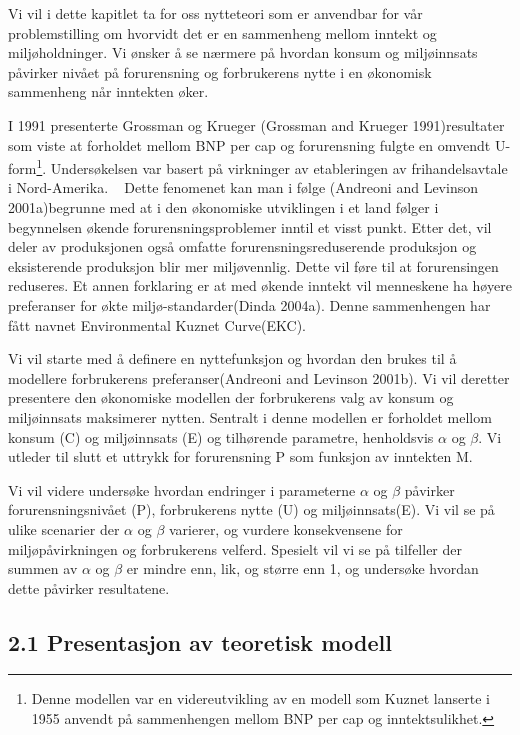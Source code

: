 \documentclass[
  12pt,
  letterpaper,
  DIV=11,
  numbers=noendperiod]{scrartcl}
\begin{document}
Vi vil i dette kapitlet ta for oss nytteteori som er anvendbar for vår
problemstilling om hvorvidt det er en sammenheng mellom inntekt og
miljøholdninger. Vi ønsker å se nærmere på hvordan konsum og
miljøinnsats påvirker nivået på forurensning og forbrukerens nytte i en
økonomisk sammenheng når inntekten øker.

I 1991 presenterte Grossman og Krueger (Grossman and Krueger
1991)resultater som viste at forholdet mellom BNP per cap og
forurensning fulgte en omvendt U-form\footnote{Denne modellen var en
  videreutvikling av en modell som Kuznet lanserte i 1955 anvendt på
  sammenhengen mellom BNP per cap og inntektsulikhet.}. Undersøkelsen
var basert på virkninger av etableringen av frihandelsavtale i
Nord-Amerika. ~ Dette fenomenet kan man i følge (Andreoni and Levinson
2001a)begrunne med at i den økonomiske utviklingen i et land følger i
begynnelsen økende forurensningsproblemer inntil et visst punkt. Etter
det, vil deler av produksjonen også omfatte forurensningsreduserende
produksjon og eksisterende produksjon blir mer miljøvennlig. Dette vil
føre til at forurensingen reduseres. Et annen forklaring er at med
økende inntekt vil menneskene ha høyere preferanser for økte
miljø-standarder(Dinda 2004a). Denne sammenhengen har fått navnet
Environmental Kuznet Curve(EKC).

Vi vil starte med å definere en nyttefunksjon og hvordan den brukes til
å modellere forbrukerens preferanser(Andreoni and Levinson 2001b). Vi
vil deretter presentere den økonomiske modellen der forbrukerens valg av
konsum og miljøinnsats maksimerer nytten. Sentralt i denne modellen er
forholdet mellom konsum (C) og miljøinnsats (E) og tilhørende parametre,
henholdsvis \(\alpha\) og \(\beta\). Vi utleder til slutt et uttrykk for
forurensning P som funksjon av inntekten M.

Vi vil videre undersøke hvordan endringer i parameterne \(\alpha\) og
\(\beta\) påvirker forurensningsnivået (P), forbrukerens nytte (U) og
miljøinnsats(E). Vi vil se på ulike scenarier der \(\alpha\) og
\(\beta\) varierer, og vurdere konsekvensene for miljøpåvirkningen og
forbrukerens velferd. Spesielt vil vi se på tilfeller der summen av
\(\alpha\) og \(\beta\) er mindre enn, lik, og større enn 1, og
undersøke hvordan dette påvirker resultatene.

\hypertarget{presentasjon-av-teoretisk-modell}{%
\subsection{2.1 Presentasjon av teoretisk
modell}\label{presentasjon-av-teoretisk-modell}}
\end{document}

